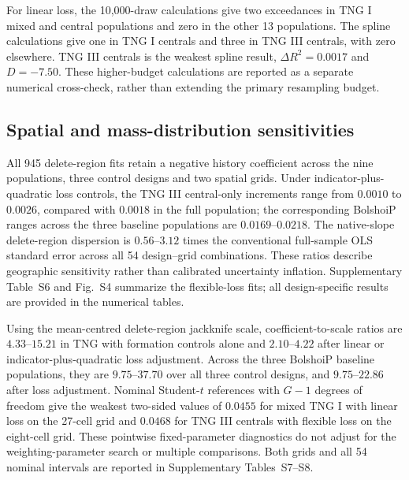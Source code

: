 \documentclass[11pt,a4paper]{article}
\begin{document}
\begin{table}[htbp]\centering\small

\caption{Restricted-cubic-spline sensitivity from the separately implemented calculations. The history coefficient uses the fiducial weighting parameter. Counts $e$ use 10,000 permutations per design and give $(e+1)/10001$. These are sample-specific, search-adjusted comparisons; they are not family-adjusted and are not pooled with the 1,000-draw results.}\label{tab:independent_spline}
\end{table}

For linear loss, the 10,000-draw calculations give two exceedances in TNG I mixed and central populations and zero in the other 13 populations. The spline calculations give one in TNG I centrals and three in TNG III centrals, with zero elsewhere. TNG III centrals is the weakest spline result, $\Delta R^2=0.0017$ and $D=-7.50$. These higher-budget calculations are reported as a separate numerical cross-check, rather than extending the primary resampling budget.

\subsection{Spatial and mass-distribution sensitivities}\label{sec:spatial_results}
All 945 delete-region fits retain a negative history coefficient across the nine populations, three control designs and two spatial grids. Under indicator-plus-quadratic loss controls, the TNG III central-only increments range from $0.0010$ to $0.0026$, compared with $0.0018$ in the full population; the corresponding BolshoiP ranges across the three baseline populations are $0.0169$--$0.0218$. The native-slope delete-region dispersion is $0.56$--$3.12$ times the conventional full-sample OLS standard error across all 54 design--grid combinations. These ratios describe geographic sensitivity rather than calibrated uncertainty inflation. Supplementary Table~S6 and Fig.~S4 summarize the flexible-loss fits; all design-specific results are provided in the numerical tables.

Using the mean-centred delete-region jackknife scale, coefficient-to-scale ratios are $4.33$--$15.21$ in TNG with formation controls alone and $2.10$--$4.22$ after linear or indicator-plus-quadratic loss adjustment. Across the three BolshoiP baseline populations, they are $9.75$--$37.70$ over all three control designs, and $9.75$--$22.86$ after loss adjustment. Nominal Student-$t$ references with $G-1$ degrees of freedom give the weakest two-sided values of $0.0455$ for mixed TNG I with linear loss on the 27-cell grid and $0.0468$ for TNG III centrals with flexible loss on the eight-cell grid. These pointwise fixed-parameter diagnostics do not adjust for the weighting-parameter search or multiple comparisons. Both grids and all 54 nominal intervals are reported in Supplementary Tables~S7--S8.
\end{document}
